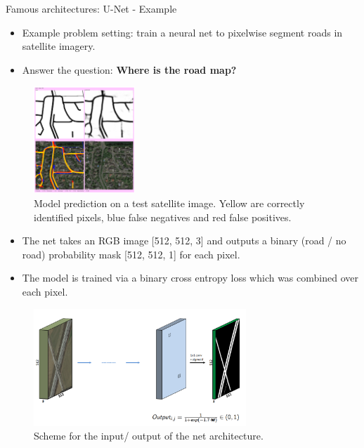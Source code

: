 \begin{vbframe}{Famous architectures:  U-Net - Example}

    \begin{itemize}
        \item Example problem setting: train a neural net to pixelwise segment roads in satellite imagery.
        \item Answer the question: \textbf{Where is the road map?}
    \end{itemize}
    \begin{figure}
        \centering
        \includegraphics[width=3.8cm]{plots/outlook/31.png}
        \caption{Model prediction on a test satellite image. Yellow are correctly identified pixels, blue false negatives and red false positives.}
    \end{figure}
\framebreak
    \begin{itemize}
        \item The net takes an RGB image [512, 512, 3] and outputs a binary (road / no road) probability mask [512, 512, 1] for each pixel.
        \item The model is trained via a binary cross entropy loss which was combined over each pixel.
    \end{itemize}

  \begin{figure}
        \centering
        \includegraphics[width=8cm]{plots/outlook/architecture_4.png}
        \caption{Scheme for the input/ output of the net architecture.}
    \end{figure}
    
    

\end{vbframe}



